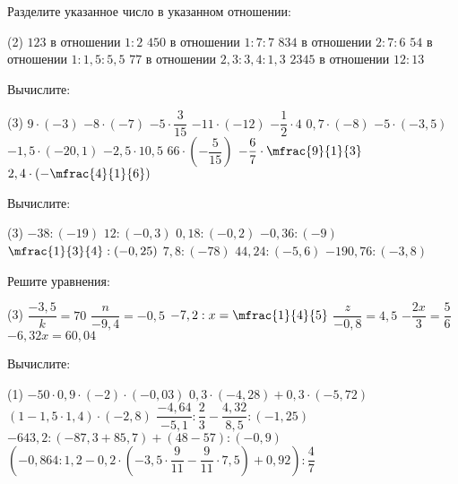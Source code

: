 \begin{class}[number=6]
	\begin{listofex}
		\item Разделите указанное число в указанном отношении:
		\begin{tasks}(2)
			\task \( 123 \) в отношении \( 1:2 \)
			\task \( 450 \) в отношении \( 1:7:7 \)
			\task \( 834 \) в отношении \( 2:7:6 \)
			\task \( 54 \) в отношении \( 1:1,5:5,5 \)
			\task \( 77 \) в отношении \( 2,3:3,4:1,3 \)
			\task \( 2345 \) в отношении \( 12:13 \)
		\end{tasks}
		\item Вычислите:
		\begin{tasks}(3)
			\task \( 9 \cdot (-3) \)
			\task \( -8 \cdot (-7) \)
			\task \( -5 \cdot \dfrac{3}{15} \)
			\task \( -11 \cdot (-12) \)
			\task \( -\dfrac{1}{2} \cdot 4 \)
			\task \( 0,7 \cdot (-8) \)
			\task \( -5 \cdot (-3,5) \)
			\task \( -1,5 \cdot (-20,1) \)
			\task \( -2,5 \cdot 10,5 \)
			\task \( 66 \cdot \left( -\dfrac{5}{15} \right) \)
			\task \( -\dfrac{6}{7}\cdot \mfrac{9}{1}{3} \)
			\task \( 2,4 \cdot \left( -\mfrac{4}{1}{6} \right) \)
		\end{tasks}
		\item Вычислите:
		\begin{tasks}(3)
			\task \( -38 : (-19) \)
			\task \( 12 : (-0,3) \)
			\task \( 0,18 : (-0,2) \)
			\task \( -0,36 : (-9) \)
			\task \( \mfrac{1}{3}{4} : (-0,25) \)
			\task \( 7,8 : (-78) \)
			\task \( 44,24:(-5,6) \)
			\task \( -190,76:(-3,8) \)
		\end{tasks}
		\item Решите уравнения:
		\begin{tasks}(3)
			\task \( \dfrac{-3,5}{k}=70 \)
			\task \( \dfrac{n}{-9,4}=-0,5 \)
			\task \( -7,2:x=\mfrac{1}{4}{5} \)
			\task \( \dfrac{z}{-0,8}=4,5 \)
			\task \( -\dfrac{2x}{3}=\dfrac{5}{6} \)
			\task \( -6,32x=60,04 \)
		\end{tasks}
		\item Вычислите:
		\begin{tasks}(1)
			\task \( -50 \cdot 0,9 \cdot (-2) \cdot (-0,03) \)
			\task \( 0,3 \cdot (-4,28) + 0,3 \cdot (-5,72) \)
			\task \( (1 - 1,5 \cdot 1,4) \cdot (-2,8) \)
			\task \( \dfrac{-4,64}{-5,1}:\dfrac{2}{3} - \dfrac{4,32}{8,5}:(-1,25) \)
			\task \( -643,2:(-87,3+85,7)+(48-57):(-0,9) \)
			\task \( \left( -0,864:1,2-0,2 \cdot \left( -3,5 \cdot \dfrac{9}{11} - \dfrac{9}{11}\cdot 7,5 \right) +0,92 \right):\dfrac{4}{7}  \)
		\end{tasks}
	\end{listofex}
\end{class}

